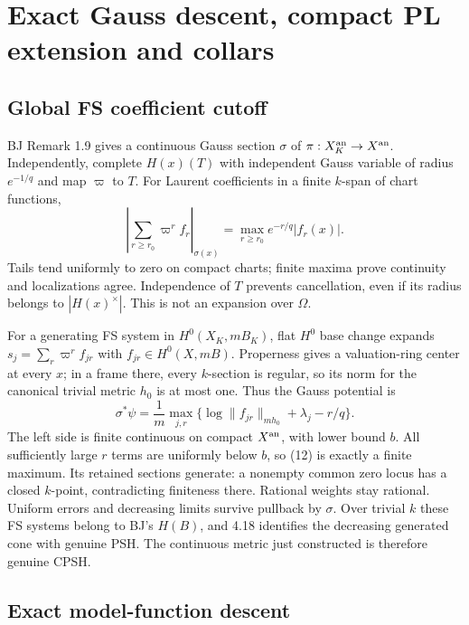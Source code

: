 \documentclass[
  10pt,
]{article}
\begin{document}
\section{Exact Gauss descent, compact PL extension and
collars}\label{exact-gauss-descent-compact-pl-extension-and-collars}

\subsection{Global FS coefficient
cutoff}\label{global-fs-coefficient-cutoff}

BJ Remark 1.9 gives a continuous Gauss section \(\sigma\) of
\(\pi:X_K^{\rm an}\to X^{\rm an}\). Independently, complete \(H(x)(T)\)
with independent Gauss variable of radius \(e^{-1/q}\) and map
\(\varpi\) to \(T\). For Laurent coefficients in a finite \(k\)-span of
chart functions, \[\left|\sum_{r\ge r_0}\varpi^r f_r\right|_{\sigma(x)}
 =\max_{r\ge r_0}e^{-r/q}|f_r(x)|. \tag{11}\] Tails tend uniformly to
zero on compact charts; finite maxima prove continuity and localizations
agree. Independence of \(T\) prevents cancellation, even if its radius
belongs to \(|H(x)^\times|\). This is not an expansion over \(\Omega\).

For a generating FS system in \(H^0(X_K,mB_K)\), flat \(H^0\) base
change expands \(s_j=\sum_r\varpi^r f_{jr}\) with
\(f_{jr}\in H^0(X,mB)\). Properness gives a valuation-ring center at
every \(x\); in a frame there, every \(k\)-section is regular, so its
norm for the canonical trivial metric \(h_0\) is at most one. Thus the
Gauss potential is \[\sigma^*\psi=\frac1m\max_{j,r}
 \{\log\|f_{jr}\|_{mh_0}+\lambda_j-r/q\}. \tag{12}\] The left side is
finite continuous on compact \(X^{\rm an}\), with lower bound \(b\). All
sufficiently large \(r\) terms are uniformly below \(b\), so (12) is
exactly a finite maximum. Its retained sections generate: a nonempty
common zero locus has a closed \(k\)-point, contradicting finiteness
there. Rational weights stay rational. Uniform errors and decreasing
limits survive pullback by \(\sigma\). Over trivial \(k\) these FS
systems belong to BJ's \(H(B)\), and 4.18 identifies the decreasing
generated cone with genuine PSH. The continuous metric just constructed
is therefore genuine CPSH.

\subsection{Exact model-function
descent}\label{exact-model-function-descent}
\end{document}
